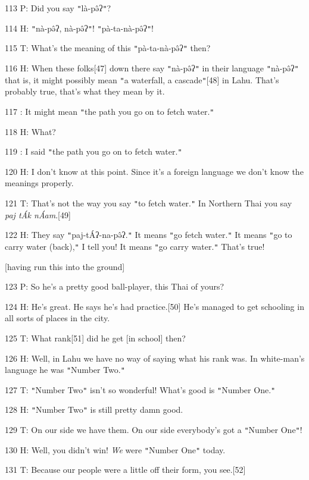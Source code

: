 113 P: Did you say \texttt{"}là-pə̂ʔ\texttt{"}?

114 H: \texttt{"}nà-pə̂ʔ, nà-pə̂ʔ\texttt{"}! \texttt{"}pà-ta-nà-pə̂ʔ\texttt{"}!

115 T: What's the meaning of this \texttt{"}pà-ta-nà-pə̂ʔ\texttt{"} then?

116 H: When these folks[47] down there say \texttt{"}nà-pə̂ʔ\texttt{"} in their
language \texttt{"}nà-pə̂ʔ\texttt{"} that is, it might possibly mean \texttt{"}a
waterfall, a cascade\texttt{"}[48] in Lahu. That's probably true, that's what they
mean by it.

117    : It might mean \texttt{"}the path you go on to fetch water.\texttt{"}

118 H: What?

119    : I said \texttt{"}the path you go on to fetch water.\texttt{"}

120 H: I don't know at this point. Since it's a foreign language we don't know
the meanings properly.

121 T: That's not the way you say \texttt{"}to fetch water.\texttt{"} In Northern
Thai you say \textit{paj tÁk nÁam}.[49]

122 H: They say \texttt{"}paj-tÁʔ-na-pə̂ʔ.\texttt{"} It means \texttt{"}go
fetch water.\texttt{"} It means \texttt{"}go to carry water (back),\texttt{"} I
tell you! It means \texttt{"}go carry water.\texttt{"} That's true!

[having run this into the ground]

123 P: So he's a pretty good ball-player, this Thai of yours?

124 H: He's great. He says he's had practice.[50] He's managed to get schooling
in all sorts of places in the city.

125 T: What rank[51] did he get [in school] then?

126 H: Well, in Lahu we have no way of saying what his rank was. In white-man's
language he was \texttt{"}Number Two.\texttt{"}

127 T: \texttt{"}Number Two\texttt{"} isn't so wonderful! What's good is \texttt{"}Number
One.\texttt{"}

128 H: \texttt{"}Number Two\texttt{"} is still pretty damn good.

129 T: On our side we have them. On our side everybody's got a \texttt{"}Number
One\texttt{"}!

130 H: Well, you didn't win! \textit{We} were \texttt{"}Number One\texttt{"} today.

131 T: Because our people were a little off their form, you see.[52]

